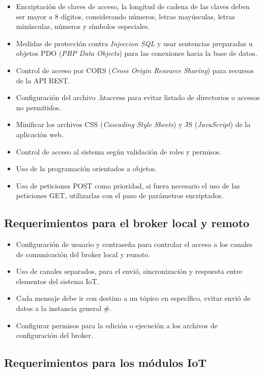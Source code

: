 \begin{itemize}
\item Encriptación de claves de acceso, la longitud de cadena de las claves  deben ser mayor a 8 dígitos, considerando números, letras mayúsculas, letras minúsculas, números y símbolos especiales.
\item Medidas de protección contra \emph{Injeccion SQL} y usar sentencias preparadas u objetos PDO (\emph{PHP Data Objects}) para las conexiones hacia la base de datos.
\item Control de acceso por CORS (\emph{Cross Origin Resource Sharing}) para recursos de la API REST.
\item Configuración del archivo .htaccess para evitar listado de directorios o accesos no permitidos.
\item Minificar los archivos CSS (\emph{Cascading Style Sheets}) y JS (\emph{JavaScript}) de la aplicación web.
\item Control de acceso al sistema según validación de roles y permisos.
\item Uso de la programación orientados a objetos.
\item Uso de peticiones POST como prioridad, si fuera necesario el uso de las peticiones GET, utilizarlas con el paso de parámetros encriptados.
\end{itemize}

\subsection{Requerimientos para el broker local y remoto}

\begin{itemize}
\item Configuración de usuario y contraseña para controlar el acceso a los canales de comunicación del broker local y remoto.
\item Uso de canales separados, para el envió, sincronización y respuesta entre elementos del sistema IoT.
\item Cada mensaje debe ir con destino a un tópico en específico, evitar envió de datos a la instancia general \#.
\item Configurar permisos para la edición o ejecución a los archivos de configuración del broker.
\end{itemize}

\subsection{Requerimientos para los módulos IoT}

